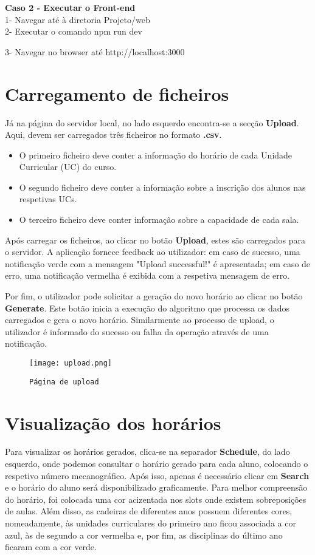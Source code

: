 \documentclass[11pt,a4paper]{report}
\begin{document}
\textbf{Caso 2 - Executar o Front-end} \\

1- Navegar até à diretoria Projeto/web \\ 

2- Executar o comando npm run dev

3- Navegar no browser até http://localhost:3000
 
\chapter{Carregamento de ficheiros}
Já na página do servidor local, no lado esquerdo encontra-se a secção \textbf{Upload}. Aqui, devem ser carregados três ficheiros no formato \textbf{.csv}. 

\begin{itemize}
  \item O primeiro ficheiro deve conter a informação do horário de cada Unidade Curricular (UC) do curso.
  \item O segundo ficheiro deve conter a informação sobre a inscrição dos alunos nas respetivas UCs.
  \item O terceiro ficheiro deve conter informação sobre a capacidade de cada sala.
\end{itemize}

Após carregar os ficheiros, ao clicar no botão \textbf{Upload}, estes são carregados para o servidor. A aplicação fornece feedback ao utilizador: em caso de sucesso, uma notificação verde com a mensagem "Upload successful!" é apresentada; em caso de erro, uma notificação vermelha é exibida com a respetiva mensagem de erro.

Por fim, o utilizador pode solicitar a geração do novo horário ao clicar no botão \textbf{Generate}. Este botão inicia a execução do algoritmo que processa os dados carregados e gera o novo horário. Similarmente ao processo de upload, o utilizador é informado do sucesso ou falha da operação através de uma notificação.

\begin{figure}[H]
    \centering
    \texttt{[image: upload.png]}
    \caption{\texttt{Página de upload}}
\end{figure}

    
    \pagebreak
    \chapter{Visualização dos horários}
Para visualizar os horários gerados, clica-se na separador \textbf{Schedule}, do lado esquerdo, onde podemos consultar o horário gerado para cada aluno, colocando o respetivo número mecanográfico. Após isso, apenas é necessário clicar em \textbf{Search} e o horário do aluno será disponibilizado graficamente. Para melhor compreensão do horário, foi colocada uma cor acizentada nos slots onde existem sobreposições de aulas. Além disso, as cadeiras de diferentes anos possuem diferentes cores, nomeadamente, às unidades curriculares do primeiro ano ficou associada a cor azul, às de segundo a cor vermelha e, por fim, as disciplinas do último ano ficaram com a cor verde.
\end{document}
